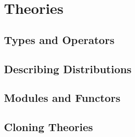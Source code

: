 \chapter{Theories}

\section{Types and Operators}

\section{Describing Distributions}

\section{Modules and Functors}

\section{Cloning Theories}

